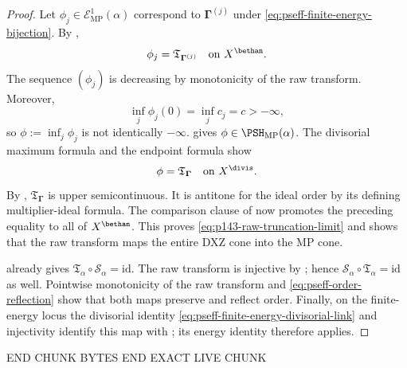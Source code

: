 \begin{proof}
Let \(\phi_j\in\mathcal E^1_{\mathrm{MP}}(\alpha)\) correspond to
\(\boldsymbol\Gamma^{(j)}\) under
\eqref{eq:pseff-finite-energy-bijection}.  By
,
\[
                    \phi_j
                    =\mathfrak T_{\boldsymbol\Gamma^{(j)}}
                    \quad\text{on }X^{\bethan}.
\]
The sequence \((\phi_j)\) is decreasing by monotonicity of the raw
transform.  Moreover,
\[
                    \inf_j\phi_j(0)=\inf_jc_j=c> -\infty,
\]
so \(\phi:=\inf_j\phi_j\) is not identically \(-\infty\).
 gives
\(\phi\in\PSH_{\mathrm{MP}}(\alpha)\).  The divisorial maximum formula
and the endpoint formula show
\[
                    \phi=\mathfrak T_{\boldsymbol\Gamma}
                    \quad\text{on }X^{\divis}.
\]
By
,
\(\mathfrak T_{\boldsymbol\Gamma}\) is upper semicontinuous.  It is
antitone for the ideal order by its defining multiplier-ideal formula.
The comparison clause of
 now promotes the preceding
equality to all of \(X^{\bethan}\).  This proves
\eqref{eq:p143-raw-truncation-limit} and shows that the raw transform maps
the entire DXZ cone into the MP cone.

 already gives
\(\mathfrak T_\alpha\circ\mathcal S_\alpha=\mathrm{id}\).  The raw
transform is injective by
; hence
\(\mathcal S_\alpha\circ\mathfrak T_\alpha=\mathrm{id}\) as well.
Pointwise monotonicity of the raw transform and
\eqref{eq:pseff-order-reflection} show that both maps preserve and reflect
order.  Finally, on the finite-energy locus the divisorial identity
\eqref{eq:pseff-finite-energy-divisorial-link} and injectivity identify
this map with ; its energy
identity therefore applies.
\end{proof}
END CHUNK BYTES
END EXACT LIVE CHUNK
